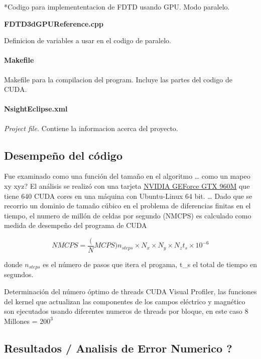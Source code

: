 \documentclass[]{article}
\let\oldparagraph\paragraph
\renewcommand{\paragraph}[1]{\oldparagraph{#1}\mbox{}}
\begin{document}
*Codigo para implemententacion de FDTD usando GPU. Modo paralelo.

\textbf{FDTD3dGPUReference.cpp}

Definicion de variables a usar en el codigo de paralelo.

\paragraph{Makefile}\label{makefile}

Makefile para la compilacion del program. Incluye las partes del codigo
de CUDA.

\paragraph{NsightEclipse.xml}\label{nsighteclipse.xml}

\emph{Project file.} Contiene la informacion acerca del proyecto.

\subsection{Desempeño del código}\label{desempeno-del-codigo}

Fue examinado como una función del tamaño en el algoritmo \ldots{} como
un mapeo xy xyz? El análisis se realizó con una tarjeta
\href{http://www.geforce.com/hardware/notebook-gpus/geforce-gtx-960m/specifications}{NVIDIA
GEForce GTX 960M} que tiene 640 CUDA cores en una máquina con
Ubuntu-Linux 64 bit. \ldots{} Dado que se recorrio un dominio de tamaño
cúbico en el problema de diferencias finitas en el tiempo, el numero de
millón de celdas por segundo (NMCPS) es calculado como medida de
desempeño del programa de CUDA

\begin{equation}
NMCPS = \frac(NMCPS){n_{steps} \times N_x \times N_y \times N_z}{t_s}\times 10^{-6}
\end{equation}

donde \(n_{steps}\) es el número de pasos que itera el progama, t\_s el
total de tiempo en segundos.

Determinación del número óptimo de threads CUDA Visual Profiler, las
funciones del kernel que actualizan las componentes de los campos
eléctrico y magnético son ejecutados usando diferentes numeros de
threads por bloque, en este caso 8 Millones = \(200^3\)

\subsection{Resultados / Analisis de Error Numerico
?}\label{resultados-analisis-de-error-numerico}
\end{document}
